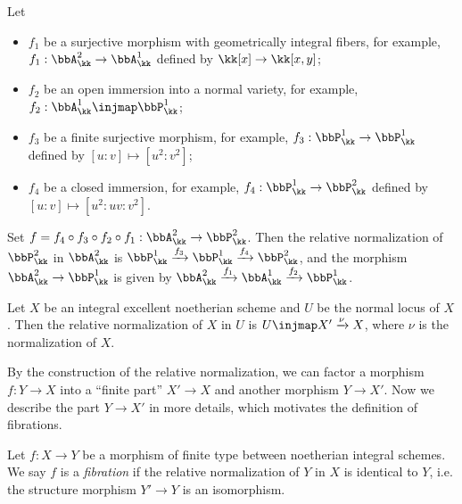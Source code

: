 \begin{example}
	Let
	\begin{itemize}[nosep]
		\item $f_1$ be a surjective morphism with geometrically integral fibers, for example, $f_1: \bbA^2_\kk \to \bbA^1_\kk$ defined by $\kk[x] \to \kk[x,y]$;
		\item $f_2$ be an open immersion into a normal variety, for example, $f_2: \bbA^1_\kk \injmap \bbP^1_\kk$;
		\item $f_3$ be a finite surjective morphism, for example, $f_3: \bbP^1_\kk \to \bbP^1_\kk$ defined by $[u:v] \mapsto [u^2:v^2]$;
		\item $f_4$ be a closed immersion, for example, $f_4: \bbP^1_\kk \to \bbP^2_\kk$ defined by $[u:v] \mapsto [u^2:uv:v^2]$.
	\end{itemize}
	Set $f = f_4 \circ f_3 \circ f_2 \circ f_1: \bbA^2_\kk \to \bbP^2_\kk$.
	Then the relative normalization of $\bbP^2_\kk$ in $\bbA^2_\kk$ is $\bbP^1_\kk \xrightarrow{f_3} \bbP^1_\kk \xrightarrow{f_4} \bbP^2_\kk$, and the morphism $\bbA^2_\kk \to \bbP^1_\kk$ is given by $\bbA^2_\kk \xrightarrow{f_1} \bbA^1_\kk \xrightarrow{f_2} \bbP^1_\kk$.
\end{example}

\begin{example}
	Let $X$ be an integral excellent noetherian scheme and $U$ be the normal locus of $X$.
	Then the relative normalization of $X$ in $U$ is $U \injmap X' \xrightarrow{\nu} X$, where $\nu$ is the normalization of $X$.
\end{example}

By the construction of the relative normalization, we can factor a morphism $f: Y \to X$ into a ``finite part'' $X' \to X$ and another morphism $Y \to X'$.
Now we describe the part $Y \to X'$ in more details, which motivates the definition of fibrations.

\begin{definition}
	Let $f: X \to Y$ be a morphism of finite type between noetherian integral schemes.
	We say $f$ is a \emph{fibration} if the relative normalization of $Y$ in $X$ is identical to $Y$, i.e. the structure morphism $Y' \to Y$ is an isomorphism.
\end{definition}

